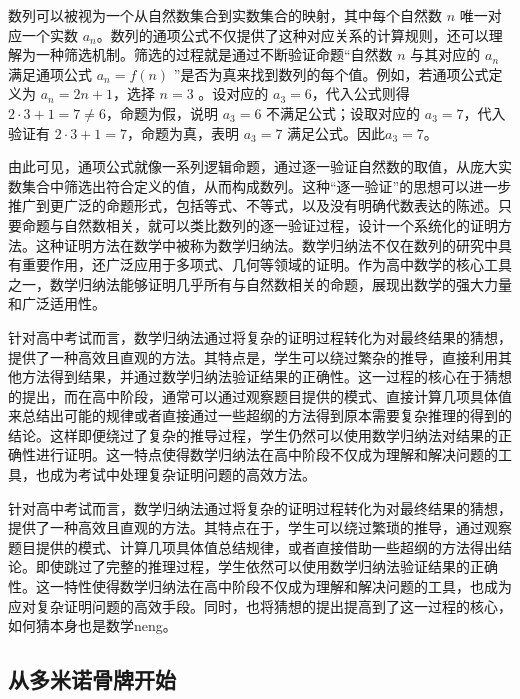 
\begin{issues}
\issueDraft
\end{issues}


数列可以被视为一个从自然数集合到实数集合的映射，其中每个自然数 $n$ 唯一对应一个实数 $a_n$。数列的通项公式不仅提供了这种对应关系的计算规则，还可以理解为一种筛选机制。筛选的过程就是通过不断验证命题“自然数 $n$ 与其对应的 $a_n$满足通项公式 $a_n = f(n)$ ”是否为真来找到数列的每个值。例如，若通项公式定义为 $a_n = 2n + 1$，选择 $n = 3$ 。设对应的 $a_3 = 6$，代入公式则得 $2 \cdot 3 + 1 = 7 \neq 6$，命题为假，说明 $a_3 = 6$ 不满足公式；设取对应的 $a_3 = 7$，代入验证有 $2 \cdot 3 + 1 = 7$，命题为真，表明 $a_3 = 7$ 满足公式。因此$a_3=7$。

由此可见，通项公式就像一系列逻辑命题，通过逐一验证自然数的取值，从庞大实数集合中筛选出符合定义的值，从而构成数列。这种“逐一验证”的思想可以进一步推广到更广泛的命题形式，包括等式、不等式，以及没有明确代数表达的陈述。只要命题与自然数相关，就可以类比数列的逐一验证过程，设计一个系统化的证明方法。这种证明方法在数学中被称为数学归纳法。数学归纳法不仅在数列的研究中具有重要作用，还广泛应用于多项式、几何等领域的证明。作为高中数学的核心工具之一，数学归纳法能够证明几乎所有与自然数相关的命题，展现出数学的强大力量和广泛适用性。

针对高中考试而言，数学归纳法通过将复杂的证明过程转化为对最终结果的猜想，提供了一种高效且直观的方法。其特点是，学生可以绕过繁杂的推导，直接利用其他方法得到结果，并通过数学归纳法验证结果的正确性。这一过程的核心在于猜想的提出，而在高中阶段，通常可以通过观察题目提供的模式、直接计算几项具体值来总结出可能的规律或者直接通过一些超纲的方法得到原本需要复杂推理的得到的结论。这样即便绕过了复杂的推导过程，学生仍然可以使用数学归纳法对结果的正确性进行证明。这一特点使得数学归纳法在高中阶段不仅成为理解和解决问题的工具，也成为考试中处理复杂证明问题的高效方法。

针对高中考试而言，数学归纳法通过将复杂的证明过程转化为对最终结果的猜想，提供了一种高效且直观的方法。其特点在于，学生可以绕过繁琐的推导，通过观察题目提供的模式、计算几项具体值总结规律，或者直接借助一些超纲的方法得出结论。即使跳过了完整的推理过程，学生依然可以使用数学归纳法验证结果的正确性。这一特性使得数学归纳法在高中阶段不仅成为理解和解决问题的工具，也成为应对复杂证明问题的高效手段。同时，也将猜想的提出提高到了这一过程的核心，如何猜本身也是数学neng。


\subsection{从多米诺骨牌开始}


